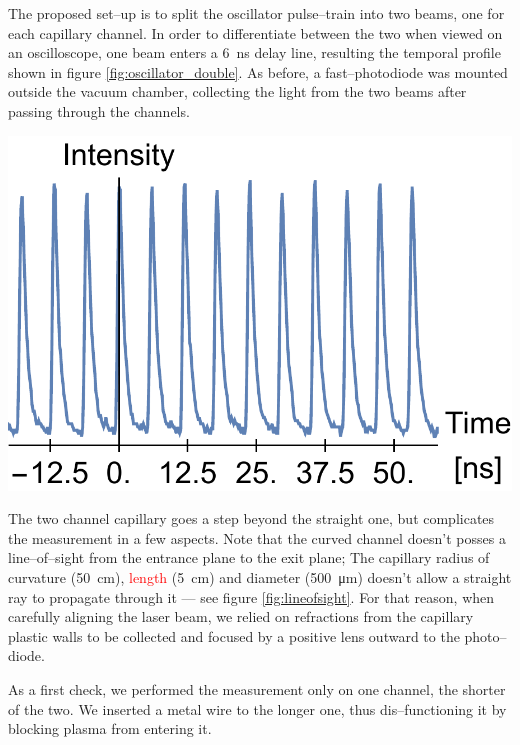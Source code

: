 \documentclass[../main.tex]{subfiles}
\begin{document}
The proposed set--up is to split the oscillator pulse--train into two beams, one for each capillary channel. In order to differentiate between the two when viewed on an oscilloscope, one beam enters a \SI{6}{\ns} delay line, resulting the temporal profile shown in figure \ref{fig:oscillator_double}. As before, a fast--photodiode was mounted outside the vacuum chamber, collecting the light from the two beams after passing through the channels.
\begin{marginfigure}
\includegraphics[width=\marginparwidth]{figures/oscillator/double.pdf}
\label{fig:oscillator_double}
\caption{Two \SI{84}{\MHz} temporal beam profiles of the oscillator laser, one delayed with respect to the other.}
\end{marginfigure}

The two channel capillary goes a step beyond the straight one, but complicates the measurement in a few aspects. Note that the curved channel doesn't posses a line--of--sight from the entrance plane to the exit plane; The capillary radius of curvature (\SI{50}{\cm}), \textcolor{red}{length} (\SI{5}{\cm}) and diameter (\SI{500}{\um}) doesn't allow a straight ray to propagate through it --- see figure \ref{fig:lineofsight}. For that reason, when carefully aligning the laser beam, we relied on refractions from the capillary plastic walls to be collected and focused by a positive lens outward to the photo--diode.

As a first check, we performed the measurement only on one channel, the shorter of the two. We inserted a metal wire to the longer one, thus dis--functioning it by blocking plasma from entering it.
\end{document}
